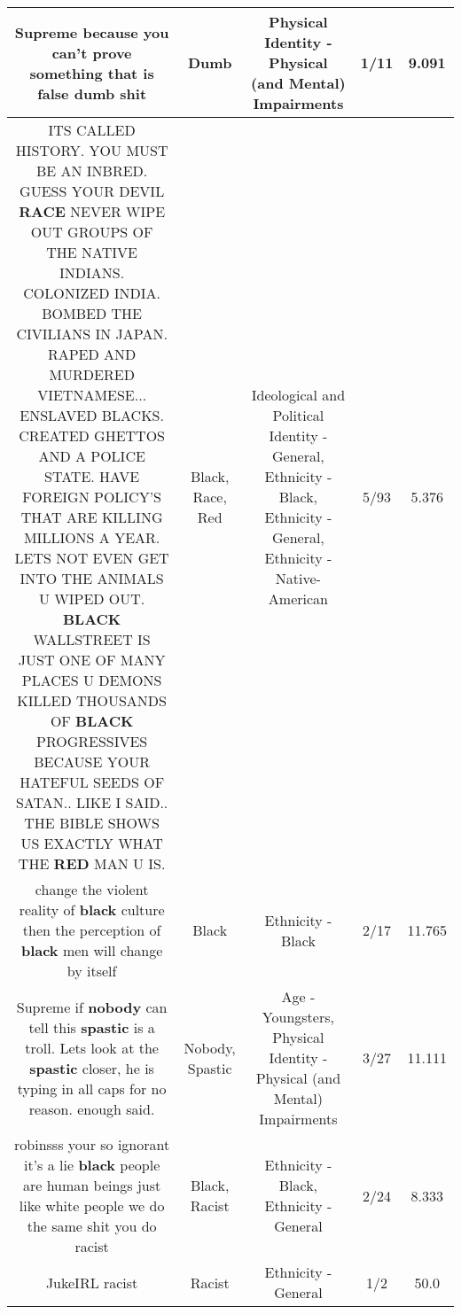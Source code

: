 \documentclass[11pt]{article}
\newlength\mylength
\begin{document}
\begin{center}
\begin{longtable}{|C{.65\mylength}|C{.30\mylength}|C{.12\mylength}|C{.12\mylength}|C{.12\mylength}|}
  \small Supreme because you can't prove something that is false \textbf{dumb} shit\normalsize   & Dumb & Physical Identity - Physical (and Mental) Impairments & 1/11 & 9.091 \\  \hline
  \small ITS CALLED HISTORY. YOU MUST BE AN INBRED. GUESS YOUR DEVIL \textbf{RACE} NEVER WIPE OUT GROUPS OF THE NATIVE INDIANS. COLONIZED INDIA. BOMBED THE CIVILIANS IN JAPAN. RAPED AND MURDERED VIETNAMESE... ENSLAVED BLACKS. CREATED GHETTOS AND A POLICE STATE.  HAVE FOREIGN POLICY'S THAT ARE KILLING MILLIONS A YEAR. LETS NOT EVEN GET INTO THE ANIMALS U WIPED OUT. \textbf{BLACK} WALLSTREET IS JUST ONE OF MANY PLACES U DEMONS KILLED THOUSANDS OF \textbf{BLACK} PROGRESSIVES BECAUSE YOUR HATEFUL SEEDS OF SATAN.. LIKE I SAID.. THE BIBLE SHOWS US EXACTLY WHAT THE \textbf{R\textbf{ED}} MAN U IS.\normalsize   & Black, Race, Red &  Ideological and Political Identity - General, Ethnicity - Black, Ethnicity - General, Ethnicity - Native-American & 5/93 & 5.376 \\  \hline
  \small change the violent reality of \textbf{black} culture then the perception of \textbf{black} men will change by itself\normalsize   & Black & Ethnicity - Black & 2/17 & 11.765 \\  \hline
  \small Supreme if \textbf{nobody} can tell this \textbf{spastic} is a troll. Lets look at the \textbf{spastic} closer, he is typing in all caps for no reason. enough said.\normalsize   & Nobody, Spastic & Age - Youngsters, Physical Identity - Physical (and Mental) Impairments & 3/27 & 11.111 \\  \hline
  \small robinsss your so ignorant it's a lie \textbf{black} people are human beings just like white people we do the same shit you do racist\normalsize   & Black, Racist & Ethnicity - Black, Ethnicity - General & 2/24 & 8.333 \\  \hline
  \small JukeIRL racist\normalsize   & Racist & Ethnicity - General & 1/2 & 50.0 \\  \hline

\end{longtable}
\end{center}
\end{document}
